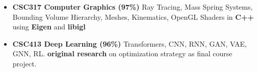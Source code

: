 \documentclass[10pt,a4paper,ragged2e,withhyper]{altacv}
\begin{document}
\begin{paracol}{2}
\begin{itemize}
    
 
    
    
\end{itemize}

\vspace{-3pt}

\vspace{-5pt}
\begin{itemize}
    
    \item  \textbf{CSC317 Computer Graphics (97\%)}
    Ray Tracing, Mass Spring Systems, Bounding Volume Hierarchy, Meshes, Kinematics, OpenGL Shaders in \textbf{C++} using
        \textbf{Eigen} and \textbf{libigl} 

    \item  \textbf{CSC413 Deep Learning (96\%)} Transformers, CNN,
        RNN, GAN, VAE, GNN, RL. \textbf{original research} on optimization
        strategy as final course project.\ 
    

\end{itemize}


\end{paracol}
\end{document}
